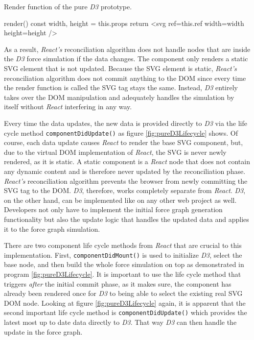 \begin{program}
\caption{Render function of the pure \emph{D3} prototype.}
\label{prog:pureD3render}
\begin{JsCode}
render() {
  const { width, height } = this.props
  return <svg ref={this.ref} width={width} height={height} />
}
\end{JsCode}
\end{program}

As a result, \emph{React's} reconciliation algorithm does not handle nodes that are inside the \emph{D3} force simulation if the data changes. The component only renders a static SVG element that is not updated. Because the SVG element is static, \emph{React's} reconciliation algorithm does not commit anything to the DOM since every time the render function is called the SVG tag stays the same. Instead, \emph{D3} entirely takes over the DOM manipulation and adequately handles the simulation by itself without \emph{React} interfering in any way.

Every time the data updates, the new data is provided directly to \emph{D3} via the life cycle method \texttt{componentDidUpdate()} as figure \ref{fig:pureD3Lifecycle} shows. Of course, each data update causes \emph{React} to render the base SVG component, but, due to the virtual DOM implementation of \emph{React}, the SVG is never newly rendered, as it is static. A static component is a \emph{React} node that does not contain any dynamic content and is therefore never updated by the reconciliation phase. \emph{React's} reconciliation algorithm prevents the browser from newly committing the SVG tag to the DOM. \emph{D3}, therefore, works completely separate from \emph{React}. \emph{D3}, on the other hand, can be implemented like on any other web project as well. Developers not only have to implement the initial force graph generation functionality but also the update logic that handles the updated data and applies it to the force graph simulation.

There are two component life cycle methods from \emph{React} that are crucial to this implementation. First, \texttt{componentDidMount()} is used to initialize \emph{D3}, select the base node, and then build the whole force simulation on top as demonstrated in program \ref{fig:pureD3Lifecycle}. It is important to use the life cycle method that triggers \emph{after} the initial commit phase, as it makes sure, the component has already been rendered once for \emph{D3} to being able to select the existing real SVG DOM node. Looking at figure \ref{fig:pureD3Lifecycle} again, it is apparent that the second important life cycle method is \texttt{componentDidUpdate()} which provides the latest most up to date data directly to \emph{D3}. That way \emph{D3} can then handle the update in the force graph.

